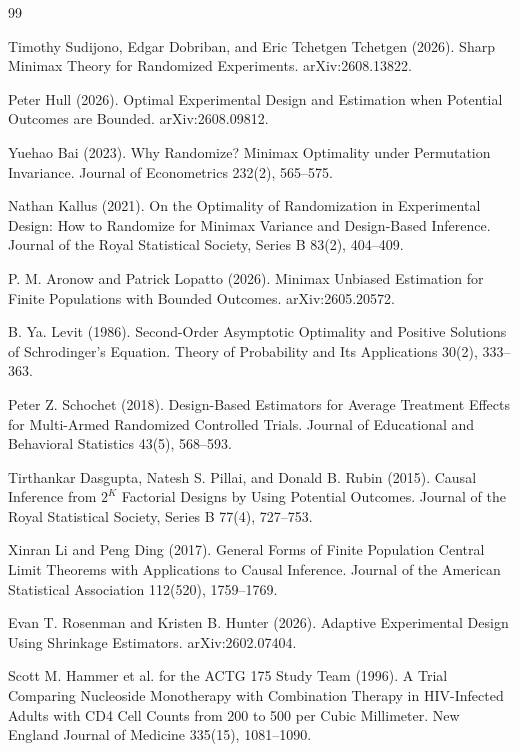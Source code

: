 \documentclass{article}
\begin{document}
\begin{thebibliography}{99}

   Timothy Sudijono, Edgar Dobriban, and Eric Tchetgen Tchetgen (2026). Sharp Minimax Theory for Randomized Experiments. arXiv:2608.13822.

   Peter Hull (2026). Optimal Experimental Design and Estimation when Potential Outcomes are Bounded. arXiv:2608.09812.

   Yuehao Bai (2023). Why Randomize? Minimax Optimality under Permutation Invariance. Journal of Econometrics 232(2), 565--575.

   Nathan Kallus (2021). On the Optimality of Randomization in Experimental Design: How to Randomize for Minimax Variance and Design-Based Inference. Journal of the Royal Statistical Society, Series B 83(2), 404--409.

   P. M. Aronow and Patrick Lopatto (2026). Minimax Unbiased Estimation for Finite Populations with Bounded Outcomes. arXiv:2605.20572.

   B. Ya. Levit (1986). Second-Order Asymptotic Optimality and Positive Solutions of Schrodinger's Equation. Theory of Probability and Its Applications 30(2), 333--363.

   Peter Z. Schochet (2018). Design-Based Estimators for Average Treatment Effects for Multi-Armed Randomized Controlled Trials. Journal of Educational and Behavioral Statistics 43(5), 568--593.

   Tirthankar Dasgupta, Natesh S. Pillai, and Donald B. Rubin (2015). Causal Inference from \(2^K\) Factorial Designs by Using Potential Outcomes. Journal of the Royal Statistical Society, Series B 77(4), 727--753.

   Xinran Li and Peng Ding (2017). General Forms of Finite Population Central Limit Theorems with Applications to Causal Inference. Journal of the American Statistical Association 112(520), 1759--1769.

   Evan T. Rosenman and Kristen B. Hunter (2026). Adaptive Experimental Design Using Shrinkage Estimators. arXiv:2602.07404.

   Scott M. Hammer et al. for the ACTG 175 Study Team (1996). A Trial Comparing Nucleoside Monotherapy with Combination Therapy in HIV-Infected Adults with CD4 Cell Counts from 200 to 500 per Cubic Millimeter. New England Journal of Medicine 335(15), 1081--1090.

\end{thebibliography}
\end{document}
